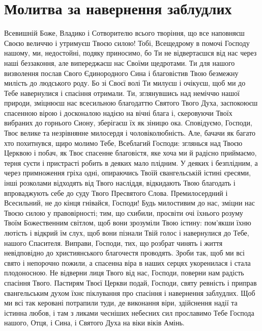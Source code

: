 \documentclass[chapters.tex]{subfiles}
\begin{document}
\section{Молитва за навернення заблудлих}
Всевишній Боже, Владико і Сотворителю всього творіння, що все наповняєш Своєю величчю і утримуєш Твоєю силою! Тобі, Всещедрому в помочі Господу нашому, ми, недостойні, подяку приносимо, бо Ти не відвертаєшся від нас через наші беззаконня, але випереджаєш нас Своїми щедротами. Ти для нашого визволення послав Свого Єдинородного Сина і благовістив Твою безмежну милість до людського роду. Бо зі Своєї волі Ти милуєш і очікуєш, щоб ми до Тебе навернулися і спасіння отримали. Ти, зглянувшись над неміччю нашої природи, зміцнюєш нас всесильною благодаттю Святого Твого Духа, заспокоюєш спасенною вірою і досконалою надією на вічні блага і, скеровуючи Твоїх вибраних до горнього Сиону, зберігаєш їх як зіницю ока. Сповідуємо, Господи, Твоє велике та незрівнянне милосердя і чоловіколюбність. Але, бачачи як багато хто похитнувся, щиро молимо Тебе, Всеблагий Господи: зглянься над Твоєю Церквою і побач, як Твоє спасенне благовістя, яке хоча ми й радісно приймаємо, терня суєти і пристрасті робить в деяких мало плідним. У деяких і безплідним, а через примноження гріха одні, опираючись Твоїй євангельській істині єресями, інші розколами відходять від Твого насліддя, відкидають Твою благодать і впроваджують себе до суду Твого Пресвятого Слова. Премилосердний і Всесильний, не до кінця гнівайся, Господи! Будь милостивим до нас, зміцни нас Твоєю силою у правовірності; тим, що схибили, просвіти очі їхнього розуму Твоїм Божественним світлом, щоб вони зрозуміли Твою істину: пом’якши їхню лютість і відкрий їм слух, щоб вони пізнали Твій голос і навернулися до Тебе, нашого Спасителя. Виправи, Господи, тих, що розбрат чинять і життя невідповідно до християнського благочестя проводять. Зроби так, щоб ми всі свято і непорочно пожили, а спасенна віра в наших серцях укоренилася і стала плодоносною. Не відверни лиця Твого від нас, Господи, поверни нам радість спасіння Твого. Пастирям Твоєї Церкви подай, Господи, святу ревність і приправ євангельським духом їхнє піклування про спасіння і навернення заблудлих. Щоб ми всі так керовані потрапили туди, де виконання віри, здійснення надії та істинна любов, і там з ликами чесніших небесних сил прославимо Тебе Господа нашого, Отця, і Сина, і Святого Духа на віки віків Амінь.
\end{document}
